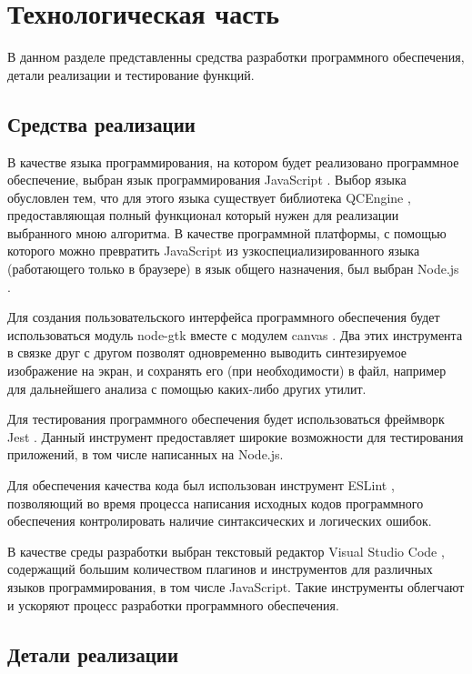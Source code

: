 \chapter{Технологическая часть}

В данном разделе представленны средства разработки программного обеспечения, детали реализации и тестирование функций.

\section{Средства реализации}

В качестве языка программирования, на котором будет реализовано программное обеспечение, выбран язык программирования JavaScript \cite{js}. Выбор языка обусловлен тем, что для этого языка существует библиотека QCEngine \cite{qcengine}, предоставляющая полный функционал который нужен для реализации выбранного мною алгоритма. В качестве программной платформы, с помощью которого можно превратить JavaScript из узкоспециализированного языка (работающего только в браузере) в язык общего назначения, был выбран Node.js \cite{nodejs}.

Для создания пользовательского интерфейса программного обеспечения будет использоваться модуль node-gtk \cite{node-gtk} вместе с модулем canvas \cite{node-canvas}. Два этих инструмента в связке друг с другом позволят одновременно выводить синтезируемое изображение на экран, и сохранять его (при необходимости) в файл, например для дальнейшего анализа с помощью каких-либо других утилит.

Для тестирования программного обеспечения будет использоваться фреймворк Jest \cite{jest}. Данный инструмент предоставляет широкие возможности для тестирования приложений, в том числе написанных на Node.js.

Для обеспечения качества кода был использован инструмент ESLint \cite{eslint}, позволяющий во время процесса написания исходных кодов программного обеспечения контролировать наличие синтаксических и логических ошибок.

В качестве среды разработки выбран текстовый редактор Visual Studio Code \cite{vscode}, содержащий большим количеством плагинов и инструментов для различных языков программирования, в том числе JavaScript. Такие инструменты облегчают и ускоряют процесс разработки программного обеспечения.

\section{Детали реализации}

